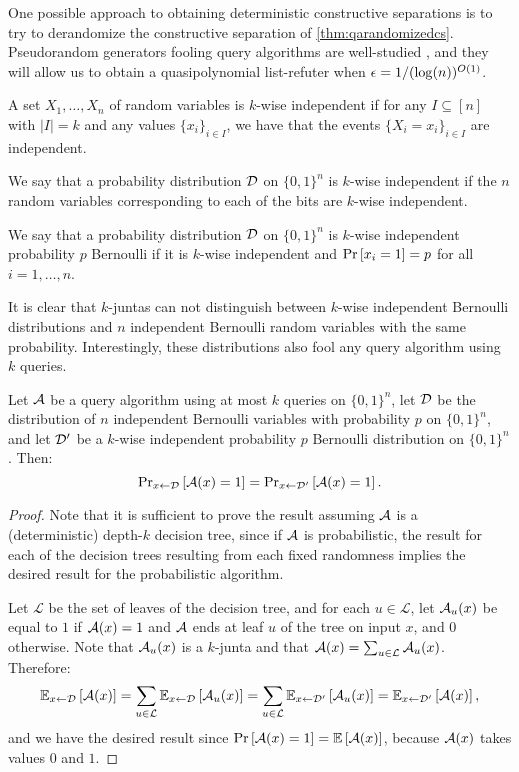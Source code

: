 One possible approach to obtaining deterministic constructive
separations is to try to derandomize 
the constructive separation of \cref{thm:qarandomizedcs}.
Pseudorandom generators fooling query algorithms are well-studied
\cite{Hatami2023}, and they will allow us to obtain a quasipolynomial
list-refuter when $\epsilon = 1/(\log(n))^{O(1)}$.

\begin{definition}
A set $X_1, \ldots, X_n$ of random variables is $k$-wise independent if for any $I \subseteq [n]$
with $|I| = k$ and any values $\{x_i\}_{i\in I}$, we have that the events $\{X_i = x_i\}_{i \in I}$ are independent.

We say that a probability distribution $\mathcal{D}$ on $\{0, 1\}^n$ is $k$-wise independent if the $n$ random variables 
corresponding to each of the bits are $k$-wise independent. 

We say that a probability distribution $\mathcal{D}$ on $\{0, 1\}^n$ is $k$-wise independent probability $p$ Bernoulli
if it is $k$-wise independent and $\text{Pr}\left[x_i = 1\right] = p$ for all $i =1 , \dots, n$. 
\end{definition}

It is clear that $k$-juntas can not distinguish between $k$-wise independent Bernoulli distributions 
and $n$ independent Bernoulli random variables with the same probability. Interestingly, 
these distributions also fool any query algorithm using $k$ queries. 


\begin{theorem}
Let $\mathcal{A}$ be a query algorithm using at most $k$ queries on $\{0, 1\}^n$, 
let $\mathcal{D}$ be the distribution of $n$ independent 
Bernoulli variables with probability $p$ on $\{0, 1\}^n$, and let
$\mathcal{D}'$ be a $k$-wise independent probability $p$ Bernoulli distribution on $\{0, 1\}^n$. Then:
$$
\text{Pr}_{x \leftarrow \mathcal{D}}\left[\mathcal{A}(x) = 1\right] = \text{Pr}_{x \leftarrow \mathcal{D}'}\left[\mathcal{A}(x) = 1\right].
$$
\end{theorem}
\begin{proof}
Note that it is sufficient to prove the result assuming $\mathcal{A}$ is a (deterministic) depth-$k$ decision tree,
since if $\mathcal{A}$ is probabilistic, the result for each of the decision trees resulting from each fixed randomness
implies the desired result for the probabilistic algorithm.

Let $\mathcal{L}$ be the set of leaves of the decision tree, and for each $u \in \mathcal{L}$,
let $\mathcal{A}_u(x)$ be equal
to $1$ if $\mathcal{A}(x) = 1$ and $\mathcal{A}$ ends at leaf $u$ of the tree on input $x$, and $0$ otherwise.
Note that $\mathcal{A}_u(x)$ is a $k$-junta
and that $\mathcal{A}(x) = \sum_{u\in \mathcal{L}} \mathcal{A}_u(x)$. Therefore:
$$
\mathbb{E}_{x \leftarrow \mathcal{D}}\left[\mathcal{A}(x)\right] = \sum_{u \in \mathcal{L}} \mathbb{E}_{x \leftarrow \mathcal{D}}\left[\mathcal{A}_u(x)\right] = \sum_{u \in \mathcal{L}} \mathbb{E}_{x \leftarrow \mathcal{D}'}\left[\mathcal{A}_u(x)\right] = \mathbb{E}_{x \leftarrow \mathcal{D}'}\left[\mathcal{A}(x)\right],
$$
and we have the desired result since  $\text{Pr}\left[\mathcal{A}(x) = 1\right] = \mathbb{E}\left[\mathcal{A}(x)\right]$,
because $\mathcal{A}(x)$ takes values $0$ and $1$.
\end{proof}

